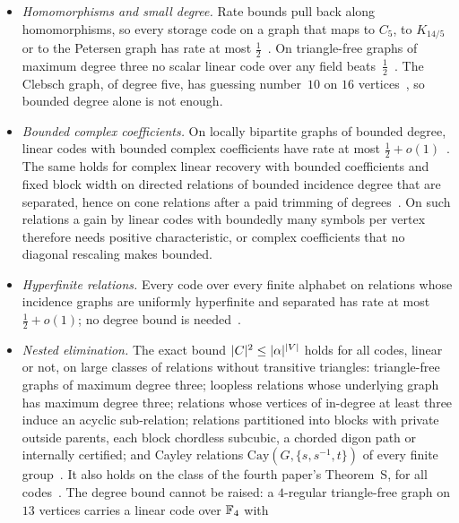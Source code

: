 \begin{itemize}[leftmargin=1.5em]
\item \emph{Homomorphisms and small degree.} Rate bounds pull back along homomorphisms, so every storage code on a
graph that maps to $C_5$, to $K_{14/5}$ or to the Petersen graph has rate at most
$\tfrac12$~\cite[Theorem~6.5 and Corollary~6.9]{FourthPaper2026}. On triangle-free graphs of maximum degree three no
scalar linear code over any field beats~$\tfrac12$~\cite[Theorem~6.13]{FourthPaper2026}. The Clebsch graph, of degree
five, has guessing number~$10$ on $16$ vertices~\cite[Corollary~6.11]{FourthPaper2026}, so bounded degree alone is not
enough.
\item \emph{Bounded complex coefficients.} On locally bipartite graphs of bounded degree, linear codes with bounded
complex coefficients have rate at most $\tfrac12+o(1)$~\cite[Theorem~6.17]{FourthPaper2026}. The same holds for complex
linear recovery with bounded coefficients and fixed block width on directed relations of bounded incidence degree that
are separated, hence on cone relations after a paid trimming of
degrees~\cite[Theorem~4.5 and Corollary~4.7]{DirectedRecovery2026}. On such relations a gain by linear codes with
boundedly many symbols per vertex therefore needs positive characteristic, or complex coefficients that no diagonal
rescaling makes bounded.
\item \emph{Hyperfinite relations.} Every code over every finite alphabet on relations whose incidence graphs are
uniformly hyperfinite and separated has rate at most $\tfrac12+o(1)$; no degree bound is
needed~\cite[Corollary~4.4]{DirectedRecovery2026}.
\item \emph{Nested elimination.} The exact bound $\lvert C \rvert^2\le\lvert \alpha \rvert^{\lvert V \rvert}$ holds for all codes, linear or not,
on large classes of relations without transitive triangles: triangle-free graphs of maximum degree three; loopless
relations whose underlying graph has maximum degree three; relations whose vertices of in-degree at least three induce
an acyclic sub-relation; relations partitioned into blocks with private outside parents, each block chordless
subcubic, a chorded digon path or internally certified; and Cayley relations $\mathrm{Cay}(G,\{s,s^{-1},t\})$ of every
finite group~\cite[Theorems~4.3, 5.2, 5.3 and~5.10, Corollary~5.12]{SeventhPaper2026}. It also holds on the class of
the fourth paper's Theorem~S, for all codes~\cite[Theorem~3.6]{DirectedReciprocity2026}. The degree bound cannot be
raised: a $4$-regular triangle-free graph on $13$ vertices carries a linear code over $\mathbb{F}_4$ with

\end{itemize}
